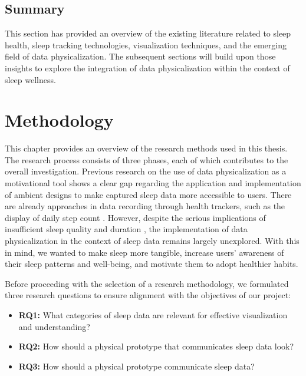 \documentclass[
  a4paper,  %
  twoside,  %
  bibliography=totoc,
  headsepline,
  cleardoublepage=empty,
  parskip=half,
  draft=false
]{scrbook}
\begin{document}
\section{Summary}
This section has provided an overview of the existing literature related to sleep health, sleep tracking technologies, visualization techniques, and the emerging field of data physicalization. The subsequent sections will build upon those insights to explore the integration of data physicalization within the context of sleep wellness.

\chapter{Methodology}
This chapter provides an overview of the research methods used in this thesis. The research process consists of three phases, each of which contributes to the overall investigation. Previous research on the use of data physicalization as a motivational tool shows a clear gap regarding the application and implementation of ambient designs to make captured sleep data more accessible to users.
There are already approaches in data recording through health trackers, such as the display of daily step count \cite{LOOP}. However, despite the serious implications of insufficient sleep quality and duration \cite{Sleep_Health_Society}, the implementation of data physicalization in the context of sleep data remains largely unexplored. With this in mind, we wanted to make sleep more tangible, increase users' awareness of their sleep patterns and well-being, and motivate them to adopt healthier habits.

Before proceeding with the selection of a research methodology, we formulated three research questions to ensure alignment with the objectives of our project:

\begin{itemize}
    \item \textbf{RQ1:} What categories of sleep data are relevant for effective visualization and understanding?
    \item \textbf{RQ2:} How should a physical prototype that communicates sleep data look?
    \item \textbf{RQ3:} How should a physical prototype communicate sleep data?
\end{itemize}
\end{document}
